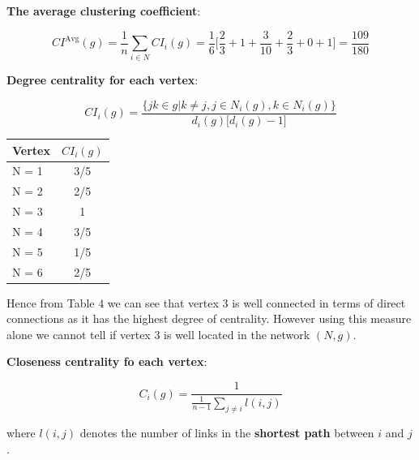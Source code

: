 \documentclass[a4paper]{article}
\begin{document}
\noindent \textbf{{\color{blue} The average clustering coefficient}}:

\begin{equation}
CI^{\text{Avg}}(g)=\frac{1}{n}\sum_{i\in N}CI_i(g) = \frac{1}{6} \big[ \frac{2}{3} + 1 + \frac{3}{10} + \frac{2}{3} + 0 + 1 \big] = \frac{109}{180}
\end{equation} 

\vspace{1cm}

\noindent \textbf{{\color{blue} Degree centrality for each vertex}}:

\begin{equation}
CI_i(g) = \frac{\Big\{ jk\in g | k \ne j, j\in N_i(g), k\in N_i(g) \Big\}}{d_i(g)\big[ d_i(g)-1\big] }
\end{equation}

\begin{table}[ht!]
	\centering
	 \label{tab:title} 
	\begin{tabular}{l@{\hskip 0.5in}c}
		Vertex & $CI_i(g)$\\
		\hline\hline
		
		N = 1 & 3/5  \\
		N = 2 & 2/5 \\
		N = 3 & 1\\
		N = 4 &  3/5 \\
		N = 5 &  1/5 \\
		N = 6 &  2/5 \\
		
		\bottomrule[1pt]
	\end{tabular}
\end{table}

Hence from Table $4$ we can see that vertex $3$ is well connected in terms of direct connections as it has the highest degree of centrality. However using this measure alone we cannot tell if vertex $3$ is well located in the network $(N, g)$. 

\noindent \textbf{{\color{blue} Closeness centrality fo each vertex}}:

\begin{equation}
	C_{i}(g) = \frac{1}{\frac{1}{n-1}\sum_{j\ne i}l(i,j)}
\end{equation}

where $l(i,j)$ denotes the number of links in the \textbf{shortest path} between $i$ and $j$. 
\end{document}
